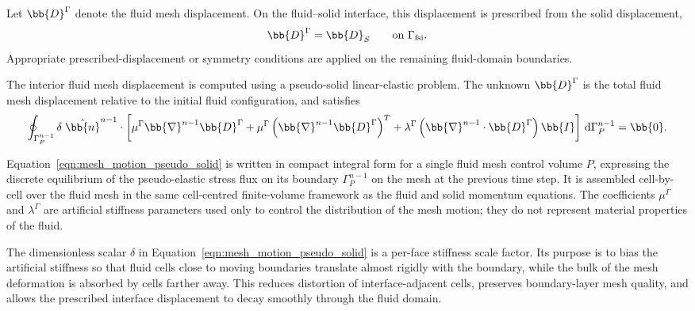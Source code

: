 Let $\bb{D}^{\Gamma}$ denote the fluid mesh displacement. On the fluid--solid
interface, this displacement is prescribed from the solid displacement,
\begin{equation}
    \bb{D}^{\Gamma}
    =
    \bb{D}_S
    \qquad
    \text{on } \Gamma_\mathrm{fsi}.
    \label{qm:eqn:mesh_displacement_interface}
\end{equation}
Appropriate prescribed-displacement or symmetry conditions are applied on the
remaining fluid-domain boundaries.

The interior fluid mesh displacement is computed using a pseudo-solid linear-elastic problem.
The unknown $\bb{D}^{\Gamma}$ is the total fluid mesh displacement relative to the initial fluid configuration, and satisfies
\begin{equation}
    \oint_{\Gamma_{P}^{n-1}}
    \delta \;
    \hat{\bb{n}}^{n-1}
    \cdot
    \left[
    \mu^\Gamma
    \bb{\nabla}^{n-1} \bb{D}^{\Gamma}
    +
    \mu^\Gamma
    \left(
    \bb{\nabla}^{n-1} \bb{D}^{\Gamma}
    \right)^T
    +
    \lambda^\Gamma
    \left(
    \bb{\nabla}^{n-1} \cdot \bb{D}^{\Gamma}
    \right)
    \bb{I}
    \right]
    \, \text{d}\Gamma_{P}^{n-1}
    =
    \bb{0}.
    \label{qm:eqn:mesh_motion_pseudo_solid}
\end{equation}

Equation~\eqref{eqn:mesh_motion_pseudo_solid} is written in compact integral form for a single fluid mesh control volume $P$, expressing the discrete equilibrium of the pseudo-elastic stress flux on its boundary $\Gamma_P^{n-1}$ on the mesh at the previous time step.
It is assembled cell-by-cell over the fluid mesh in the same cell-centred finite-volume framework as the fluid and solid momentum equations.
The coefficients $\mu^\Gamma$ and $\lambda^\Gamma$ are artificial stiffness parameters used only to control the distribution of the mesh motion; they do not represent material properties of the fluid.

The dimensionless scalar $\delta$ in Equation~\eqref{eqn:mesh_motion_pseudo_solid} is a per-face stiffness scale factor.
Its purpose is to bias the artificial stiffness so that fluid cells close to moving boundaries translate almost rigidly with the boundary, while the bulk of the
mesh deformation is absorbed by cells farther away.
This reduces distortion of interface-adjacent cells, preserves boundary-layer mesh quality, and allows the prescribed interface displacement to decay smoothly through the fluid domain.

